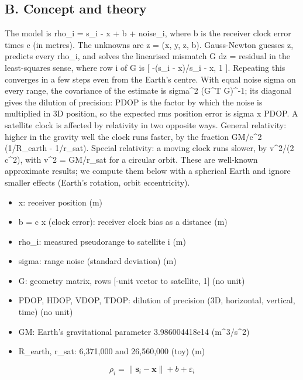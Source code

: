 \documentclass[11pt,a4paper]{article}
\begin{document}
\subsection*{B. Concept and theory}
The model is rho\_i = \textbar{}s\_i - x\textbar{} + b + noise\_i, where b is the receiver clock error times c (in metres). The unknowns are z = (x, y, z, b). Gauss-Newton guesses z, predicts every rho\_i, and solves the linearised mismatch G dz = residual in the least-squares sense, where row i of G is [ -(s\_i - x)/\textbar{}s\_i - x\textbar{}, 1 ]. Repeating this converges in a few steps even from the Earth's centre. With equal noise sigma on every range, the covariance of the estimate is sigma\textasciicircum{}2 (G\textasciicircum{}T G)\textasciicircum{}-1; its diagonal gives the dilution of precision: PDOP is the factor by which the noise is multiplied in 3D position, so the expected rms position error is sigma x PDOP. A satellite clock is affected by relativity in two opposite ways. General relativity: higher in the gravity well the clock runs faster, by the fraction GM/c\textasciicircum{}2 (1/R\_earth - 1/r\_sat). Special relativity: a moving clock runs slower, by v\textasciicircum{}2/(2 c\textasciicircum{}2), with v\textasciicircum{}2 = GM/r\_sat for a circular orbit. These are well-known approximate results; we compute them below with a spherical Earth and ignore smaller effects (Earth's rotation, orbit eccentricity).

\begin{itemize}[nosep]
\item x: receiver position (m)
\item b = c x (clock error): receiver clock bias as a distance (m)
\item rho\_i: measured pseudorange to satellite i (m)
\item sigma: range noise (standard deviation) (m)
\item G: geometry matrix, rows [-unit vector to satellite, 1] (no unit)
\item PDOP, HDOP, VDOP, TDOP: dilution of precision (3D, horizontal, vertical, time) (no unit)
\item GM: Earth's gravitational parameter 3.986004418e14 (m\textasciicircum{}3/s\textasciicircum{}2)
\item R\_earth, r\_sat: 6,371,000 and 26,560,000 (toy) (m)
\end{itemize}

\begin{equation*}
\rho_i=\|\mathbf s_i-\mathbf x\|+b+\varepsilon_i
\end{equation*}
\end{document}
